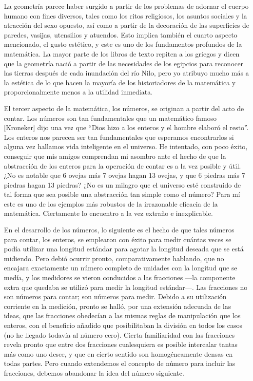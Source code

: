\documentclass[a4paper, 12pt]{article}
\begin{document}
 

La geometría parece haber surgido a partir de los problemas de adornar el cuerpo humano con fines diversos, tales como los ritos religiosos, los asuntos sociales y la atracción del sexo opuesto, así como a partir de la decoración de las superficies de paredes, vasijas, utensilios y atuendos. Esto implica también el cuarto aspecto mencionado, el gusto estético, y este es uno de los fundamentos profundos de la matemática. La mayor parte de los libros de texto repiten a los griegos y dicen que la geometría nació a partir de las necesidades de los egipcios para reconocer las tierras después de cada inundación del río Nilo, pero yo atribuyo mucho más a la estética de lo que hacen la mayoría de los historiadores de la matemática y proporcionalmente menos a la utilidad inmediata.

 

El tercer aspecto de la matemática, los números, se originan a partir del acto de contar. Los números son tan fundamentales que un matemático famoso [Kroneker] dijo una vez que ``Dios hizo a los enteros y el hombre elaboró el resto''. Los enteros nos parecen ser tan fundamentales que esperamos encontrarlos si alguna vez hallamos vida inteligente en el universo. He intentado, con poco éxito, conseguir que mis amigos comprendan mi asombro ante el hecho de que la abstracción de los enteros para la operación de contar es a la vez posible y útil. ¿No es notable que 6 ovejas más 7 ovejas hagan 13 ovejas, y que 6 piedras más 7 piedras hagan 13 piedras? ¿No es un milagro que el universo esté construido de tal forma que sea posible una abstracción tan simple como el número? Para mí este es uno de los ejemplos más robustos de la irrazonable eficacia de la matemática. Ciertamente lo encuentro a la vez extraño e inexplicable.

 

En el desarrollo de los números, lo siguiente es el hecho de que tales números para contar, los enteros, se emplearon con éxito para medir cuántas veces se podía utilizar una longitud estándar para agotar la longitud deseada que se está midiendo. Pero debió ocurrir pronto, comparativamente hablando, que no encajara exactamente un número completo de unidades con la longitud que se medía, y los medidores se vieron conducidos a las fracciones ---la componente extra que quedaba se utilizó para medir la longitud estándar---. Las fracciones no son números para contar; son números para medir. Debido a su utilización corriente en la medición, pronto se halló, por una extensión adecuada de las ideas, que las fracciones obedecían a las mismas reglas de manipulación que los enteros, con el beneficio añadido que posibilitaban la división en todos los casos (no he llegado todavía al número cero). Cierta familiaridad con las fracciones revela pronto que entre dos fracciones cualesquiera es posible intercalar tantas más como uno desee, y que en cierto sentido son homogéneamente densas en todas partes. Pero cuando extendemos el concepto de número para incluir las fracciones, debemos abandonar la idea del número siguiente.
\end{document}
